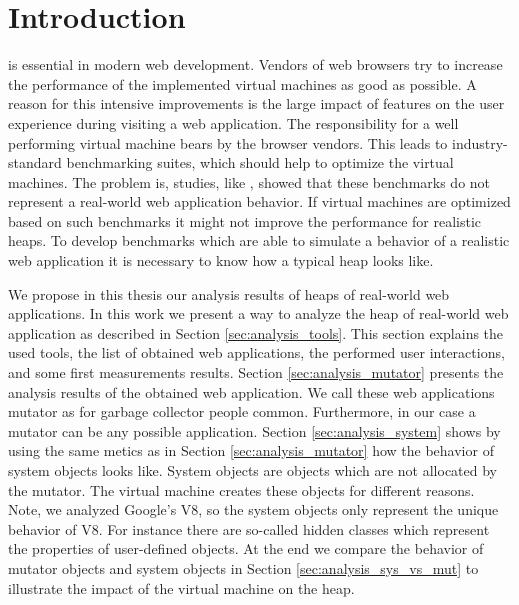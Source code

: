 
\section{Introduction}

\JS is essential in modern web development. Vendors of web browsers try to increase the performance of the implemented \JS virtual machines as good as possible. A reason for this intensive improvements is the large impact of \JS features on the user experience during visiting a web application. The responsibility for a well performing \JS virtual machine bears by the browser vendors. This leads to industry-standard benchmarking suites, which should help to optimize the \JS virtual machines. The problem is, studies, like \cite{JSMeter2009}, showed that these benchmarks do not represent a real-world web application behavior. If \JS virtual machines are optimized based on such benchmarks it might not improve the performance for realistic \JS heaps. To develop benchmarks which are able to simulate a behavior of a realistic web application it is necessary to know how a typical \JS heap looks like. 

We propose in this thesis our analysis results of \JS heaps of real-world web applications. In this work we present a way to analyze the heap of real-world web application as described in Section \ref{sec:analysis_tools}. This section explains the used tools, the list of obtained web applications, the performed user interactions, and some first measurements results. Section \ref{sec:analysis_mutator} presents the analysis results of the obtained web application. We call these web applications mutator as for garbage collector people common. Furthermore, in our case a mutator can be any possible \JS application. Section \ref{sec:analysis_system} shows by using the same metics as in Section \ref{sec:analysis_mutator} how the behavior of system objects looks like. System objects are objects which are not allocated by the mutator. The virtual machine creates these objects for different reasons. Note, we analyzed Google's V8, so the system objects only represent the unique behavior of V8. For instance there are so-called hidden classes which represent the properties of user-defined objects. At the end we compare the behavior of mutator objects and system objects in Section \ref{sec:analysis_sys_vs_mut} to illustrate the impact of the virtual machine on the \JS heap.